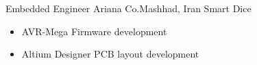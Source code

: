 	{Embedded Engineer}
	{Ariana Co.}{Mashhad, Iran}
	{
        \newline 
        Smart Dice
        }
        {
        \begin{itemize}
            \item AVR-Mega Firmware development
            \item Altium Designer  PCB layout development 
        \end{itemize}
        }


 


\vspace{2mm}


        
        

